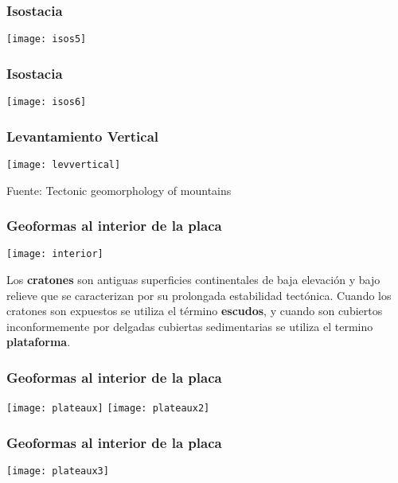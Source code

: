 \documentclass{beamer}
\begin{document}
\begin{frame}
\frametitle{Isostacia}
\begin{center}
\texttt{[image: isos5]}
\end{center}
\end{frame}
\begin{frame}
\frametitle{Isostacia}
\begin{center}
\texttt{[image: isos6]}
\end{center}
\end{frame}
\begin{frame}
\frametitle{Levantamiento Vertical}
\begin{center}
\texttt{[image: levvertical]}
\end{center}
\tiny{Fuente: Tectonic geomorphology of mountains}
\end{frame}
\begin{frame}
\frametitle{Geoformas al interior de la placa}
\begin{center}
\texttt{[image: interior]}
\end{center}
\justifying
\small{Los \textbf{cratones} son antiguas superficies continentales de baja elevación y bajo relieve que se caracterizan por su prolongada estabilidad tectónica. Cuando los cratones son expuestos se utiliza el término \textbf{escudos}, y cuando son cubiertos inconformemente por delgadas cubiertas sedimentarias se utiliza el termino \textbf{plataforma}.}
\end{frame}
\begin{frame}
\frametitle{Geoformas al interior de la placa}
\begin{center}
\texttt{[image: plateaux]}\vfill
\texttt{[image: plateaux2]}
\end{center}
\end{frame}
\begin{frame}
\frametitle{Geoformas al interior de la placa}
\begin{center}
\texttt{[image: plateaux3]}
\end{center}
\end{frame}
\end{document}

